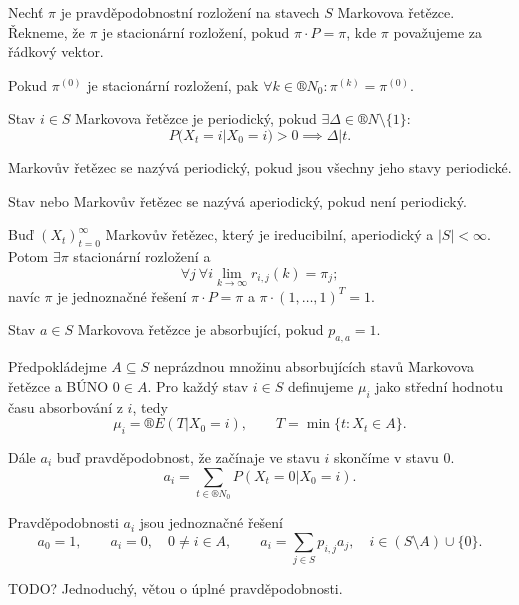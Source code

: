 \documentclass[12pt]{article}					%
\begin{document}
\begin{definice}
	Nechť $\pi$ je pravděpodobnostní rozložení na stavech $S$ Markovova řetězce. Řekneme, že $\pi$ je stacionární rozložení, pokud $\pi·P = \pi$, kde $\pi$ považujeme za řádkový vektor.
\end{definice}

\begin{dusledek}
	Pokud $\pi^{(0)}$ je stacionární rozložení, pak $\forall k \in ®N_0: \pi^{(k)} = \pi^{(0)}$.
\end{dusledek}

\begin{definice}
	Stav $i \in S$ Markovova řetězce je periodický, pokud $\exists \Delta \in ®N \setminus \{1\}$:
	$$ P(X_t = i | X_0 = i) > 0 \implies \Delta | t. $$

	Markovův řetězec se nazývá periodický, pokud jsou všechny jeho stavy periodické.

	Stav nebo Markovův řetězec se nazývá aperiodický, pokud není periodický.
\end{definice}

\begin{veta}
	Buď $(X_t)_{t=0}^∞$ Markovův řetězec, který je ireducibilní, aperiodický a $|S| < ∞$. Potom $\exists \pi$ stacionární rozložení a
	$$ \forall j\ \forall i \lim_{k \rightarrow ∞} r_{i, j}(k) = \pi_j; $$
	navíc $\pi$ je jednoznačné řešení $\pi·P = \pi$ a $\pi·(1, …, 1)^T = 1$.
\end{veta}

\begin{definice}
	Stav $a \in S$ Markovova řetězce je absorbující, pokud $p_{a, a} = 1$.
\end{definice}

\begin{definice}
	Předpokládejme $A \subseteq S$ neprázdnou množinu absorbujících stavů Markovova řetězce a BÚNO $0 \in A$. Pro každý stav $i \in S$ definujeme $\mu_i$ jako střední hodnotu času absorbování z $i$, tedy
	$$ \mu_i = ®E(T | X_0 = i), \qquad T = \min\{t: X_t \in A\}. $$

	Dále $a_i$ buď pravděpodobnost, že začínaje ve stavu $i$ skončíme v stavu $0$.
	$$ a_i = \sum_{t \in ®N_0} P(X_t = 0 | X_0 = i). $$
\end{definice}

\begin{veta}
	Pravděpodobnosti $a_i$ jsou jednoznačné řešení
	$$ a_0 = 1, \qquad a_i = 0, \quad 0 ≠ i \in A, \qquad a_i = \sum_{j \in S} p_{i, j} a_j, \quad i \in (S \setminus A) \cup \{0\}. $$

	\begin{dukazin}
		TODO? Jednoduchý, větou o úplné pravděpodobnosti. %
	\end{dukazin}
\end{veta}
\end{document}
